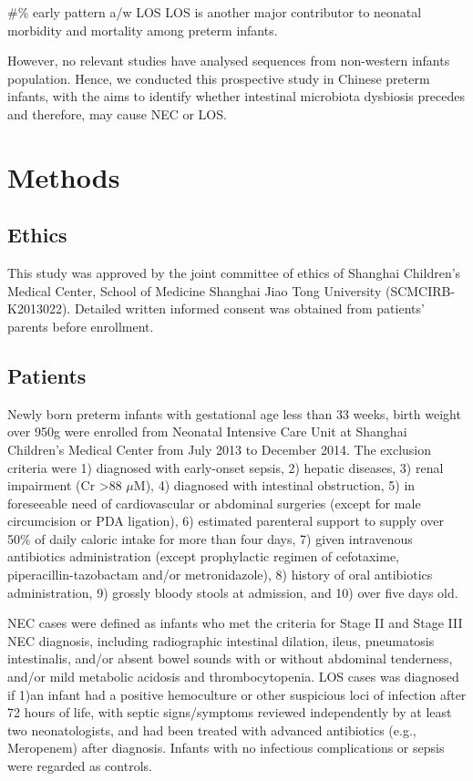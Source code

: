 \documentclass[fleqn,10pt, lineno]{wlpeerj} %
\begin{document}
\#\% early pattern a/w LOS
LOS is another major contributor to neonatal morbidity and mortality among preterm infants.


\noindent
However, no relevant studies have analysed sequences from non-western infants population. Hence, we conducted this prospective study in Chinese preterm infants, with the aims to identify whether intestinal microbiota dysbiosis precedes and therefore, may cause NEC or LOS.


\section*{Methods}
  \subsection*{Ethics}
  This study was approved by the joint committee of ethics of Shanghai Children’s Medical Center, School of Medicine Shanghai Jiao Tong University (SCMCIRB-K2013022). Detailed written informed consent was obtained from patients' parents before enrollment.

  \subsection*{Patients}
  Newly born preterm infants with gestational age less than 33 weeks, birth weight over 950g were enrolled from Neonatal Intensive Care Unit at Shanghai Children’s Medical Center from July 2013 to December 2014. The exclusion criteria were 1) diagnosed with early-onset sepsis, 2) hepatic diseases, 3) renal impairment (Cr \textgreater 88 $\mu$M), 4) diagnosed with intestinal obstruction, 5) in foreseeable need of cardiovascular or abdominal surgeries (except for male circumcision or PDA ligation), 6) estimated parenteral support to supply over 50\% of daily caloric intake for more than four days, 7) given intravenous antibiotics administration (except prophylactic regimen of cefotaxime, piperacillin-tazobactam and/or metronidazole), 8) history of oral antibiotics administration, 9) grossly bloody stools at admission, and 10) over five days old.

  \noindent
  NEC cases were defined as infants who met the criteria for Stage II and Stage III NEC diagnosis\citep{bell1978neonatal}, including radiographic intestinal dilation, ileus, pneumatosis intestinalis, and/or absent bowel sounds with or without abdominal tenderness, and/or mild metabolic acidosis and thrombocytopenia. LOS cases was diagnosed if 1)an infant had a positive hemoculture or other suspicious loci of infection after 72 hours of life, with septic signs/symptoms reviewed independently by at least two neonatologists, and had been treated with advanced antibiotics (e.g., Meropenem) after diagnosis. Infants with no infectious complications or sepsis were regarded as controls.
\end{document}
